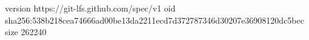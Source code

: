 version https://git-lfs.github.com/spec/v1
oid sha256:538b218cea74666ad00be13da2211ecd7d372787346d30207e36908120dc5bec
size 262240
